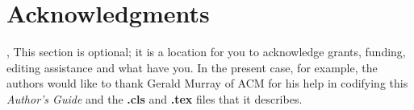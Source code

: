 \documentclass{acm_proc_article-sp}
\begin{document}
\section{Acknowledgments}
\cite{howe:rise, marjanovic:current, div:crowd}, 
This section is optional; it is a location for you
to acknowledge grants, funding, editing assistance and
what have you.  In the present case, for example, the
authors would like to thank Gerald Murray of ACM for
his help in codifying this \textit{Author's Guide}
and the \textbf{.cls} and \textbf{.tex} files that it describes.

%

%
%
\end{document}
